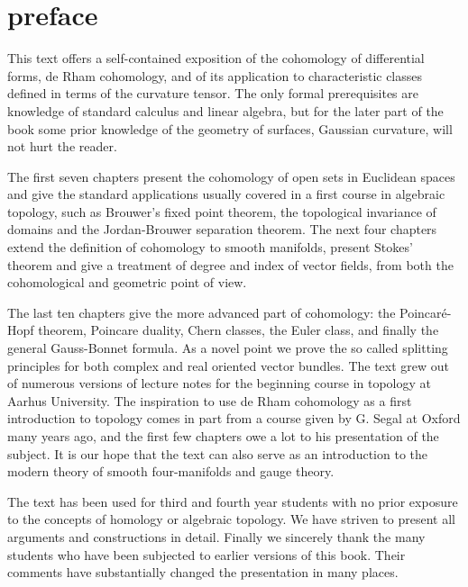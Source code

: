 \chapter*{preface}
{}

This text offers a self-contained exposition of the cohomology of differential
forms, de Rham cohomology, and of its application to characteristic classes
defined in terms of the curvature tensor. The only formal prerequisites are knowledge 
of standard calculus and linear algebra, but for the later part of the
book some prior knowledge of the geometry of surfaces, Gaussian curvature, will
not hurt the reader.

The first seven chapters present the cohomology of open sets in Euclidean spaces
and give the standard applications usually covered in a first course in algebraic
topology, such as Brouwer's fixed point theorem, the topological invariance of
domains and the Jordan-Brouwer separation theorem. The next four chapters
extend the definition of cohomology to smooth manifolds, present Stokes' theorem 
and give a treatment of degree and index of vector fields, from both the cohomological 
and geometric point of view. 

The last ten chapters give the more advanced part of cohomology:
the Poincar\'{e}-Hopf theorem, Poincare duality, Chern classes, the Euler class, and
finally the general Gauss-Bonnet formula. As a novel point we prove the so
called splitting principles for both complex and real oriented vector bundles.
The text grew out of numerous versions of lecture notes for the beginning course
in topology at Aarhus University. The inspiration to use de Rham cohomology as
a first introduction to topology comes in part from a course given by G. Segal at
Oxford many years ago, and the first few chapters owe a lot to his presentation
of the subject. It is our hope that the text can also serve as an introduction to the
modern theory of smooth four-manifolds and gauge theory.

The text has been used for third and fourth year students with no prior exposure
to the concepts of homology or algebraic topology. We have striven to present
all arguments and constructions in detail. Finally we sincerely thank the many
students who have been subjected to earlier versions of this book. Their comments
have substantially changed the presentation in many places.

\vspace*{2em}
\newpage
